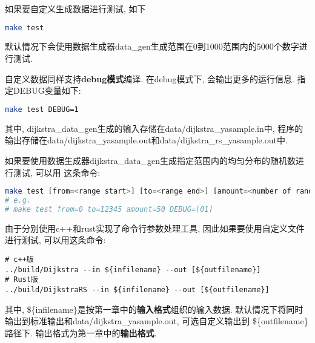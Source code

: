 如果要自定义生成数据进行测试, 如下
\begin{lstlisting}[language=bash]
make test
\end{lstlisting}
默认情况下会使用数据生成器data\_gen生成范围在0到1000范围内的5000个数字进行测试.\par

自定义数据同样支持\textbf{debug模式}编译. 在debug模式下, 会输出更多的运行信息.
指定DEBUG变量如下:
\begin{lstlisting}[language=bash]
make test DEBUG=1
\end{lstlisting}

其中, dijkstra\_data\_gen生成的输入存储在data/dijkstra\_yasample.in中,
程序的输出存储在data/dijkstra\_yasample.out和data/dijkstra\_rs\_yasample.out中. \par

如果要使用数据生成器dijkstra\_data\_gen生成指定范围内的均匀分布的随机数进行测试, 可以用
这条命令:
\begin{lstlisting}[language=bash]
make test [from=<range start>] [to=<range end>] [amount=<number of random numbers>]
# e.g. 
# make test from=0 to=12345 amount=50 DEBUG=[01]
\end{lstlisting}

由于分别使用c++和rust实现了命令行参数处理工具, 因此如果要使用自定义文件进行测试,
可以用这条命令:
\begin{lstlisting}
# c++版
../build/Dijkstra --in ${infilename} --out [${outfilename}]
# Rust版
../build/DijkstraRS --in ${infilename} --out [${outfilename}]
\end{lstlisting}
其中, \$\{infilename\}是按第一章中的\textbf{输入格式}组织的输入数据.
默认情况下将同时输出到标准输出和data/dijkstra\_yasample.out, 可选自定义输出到
\$\{outfilename\}路径下. 输出格式为第一章中的\textbf{输出格式}.

